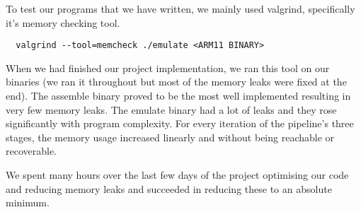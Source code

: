 To test our programs that we have written, we mainly used valgrind, specifically it's memory checking tool.

\begin{verbatim}
  valgrind --tool=memcheck ./emulate <ARM11 BINARY>
\end{verbatim}

When we had finished our project implementation, we ran this tool on our binaries (we ran it throughout but most of the memory leaks were fixed at the end). The assemble binary proved to be the most well implemented resulting in very few memory leaks. The emulate binary had a lot of leaks and they rose significantly with program complexity. For every iteration of the pipeline's three stages, the memory usage increased linearly and without being reachable or recoverable.

We spent many hours over the last few days of the project optimising our code and reducing memory leaks and succeeded in reducing these to an absolute minimum.